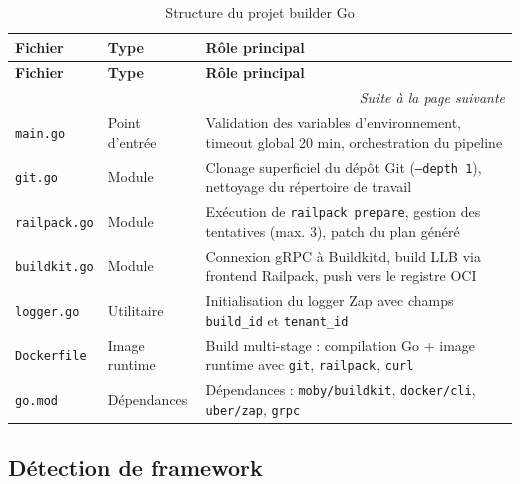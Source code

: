 \begin{longtable}{|p{4cm}|p{2.5cm}|p{7cm}|}
\caption{Structure du projet builder Go}
\label{tab:builder-files} \\

\hline
\textbf{Fichier} & \textbf{Type} & \textbf{Rôle principal} \\
\hline
\endfirsthead

\hline
\textbf{Fichier} & \textbf{Type} & \textbf{Rôle principal} \\
\hline
\endhead

\hline
\multicolumn{3}{r|}{\small\textit{Suite à la page suivante}} \\
\endfoot

\hline
\endlastfoot

\texttt{main.go}              & Point d'entrée   & Validation des variables d'environnement, timeout global 20 min, orchestration du pipeline \\
\hline
\texttt{git.go}               & Module           & Clonage superficiel du dépôt Git (\texttt{--depth 1}), nettoyage du répertoire de travail \\
\hline
\texttt{railpack.go}          & Module           & Exécution de \texttt{railpack prepare}, gestion des tentatives (max. 3), patch du plan généré \\
\hline
\texttt{buildkit.go}          & Module           & Connexion gRPC à Buildkitd, build LLB via frontend Railpack, push vers le registre OCI \\
\hline
\texttt{logger.go}            & Utilitaire       & Initialisation du logger Zap avec champs \texttt{build\_id} et \texttt{tenant\_id} \\
\hline
\texttt{Dockerfile}           & Image runtime    & Build multi-stage : compilation Go + image runtime avec \texttt{git}, \texttt{railpack}, \texttt{curl} \\
\hline
\texttt{go.mod}               & Dépendances      & Dépendances : \texttt{moby/buildkit}, \texttt{docker/cli}, \texttt{uber/zap}, \texttt{grpc} \\
\hline


\end{longtable}

\subsection{Détection de framework}

